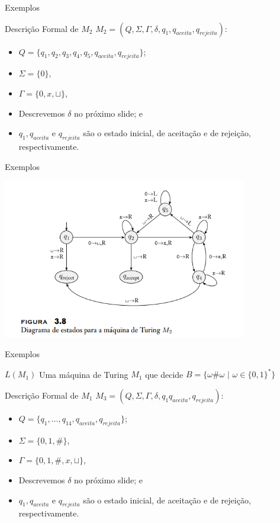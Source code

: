 \documentclass[xcolor=dvipsnames,table]{beamer}
\begin{document}
	\begin{frame}{Exemplos}
		\begin{block}{Descrição Formal de $M_2$}
			$M_2 = (Q, \Sigma, \Gamma, \delta, q_1, q_{aceita}, q_{rejeita})$:
			\begin{itemize}
				\item $Q = \{ q_1, q_2, q_3, q_4, q_5, q_{aceita}, q_{rejeita} \}$;
				\item $\Sigma = \{ 0 \}$,
				\item $\Gamma = \{ 0, x, \sqcup \}$,
				\item Descrevemos $\delta$ no próximo slide; e
				\item $q_1, q_{aceita}$ e $q_{rejeita}$ são o estado inicial, de aceitação e de rejeição, respectivamente.
			\end{itemize}
		\end{block}
	\end{frame}
	
	\begin{frame}{Exemplos}
		\begin{center}
			\includegraphics[height=7cm]{images/fig38.png}
		\end{center}
	\end{frame}
	
	\begin{frame}{Exemplos}
		\begin{block}{$L(M_1)$}
			Uma máquina de Turing $M_1$ que decide $B = \{ \omega \# \omega \mbox{ | } \omega \in \{ 0, 1 \}^* \}$		
		\end{block}        
		\begin{block}{Descrição Formal de $M_1$}
			$M_3 = (Q, \Sigma, \Gamma, \delta, q_1 q_{aceita}, q_{rejeita})$:
			\begin{itemize}
				\item $Q = \{ q_1, \ldots, q_{14}, q_{aceita}, q_{rejeita} \}$;
				\item $\Sigma = \{ 0, 1, \# \}$,
				\item $\Gamma = \{ 0, 1, \#, x, \sqcup \}$,
				\item Descrevemos $\delta$ no próximo slide; e
				\item $q_1, q_{aceita}$ e $q_{rejeita}$ são o estado inicial, de aceitação e de rejeição, respectivamente.
			\end{itemize}
		\end{block}
	\end{frame}
	
\end{document}
